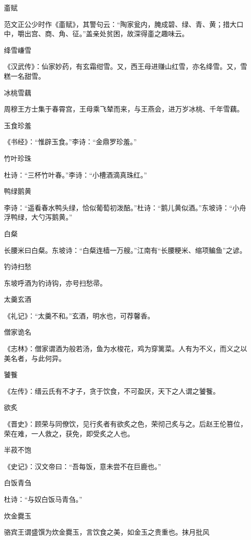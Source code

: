 \documentclass[a4paper,12pt,UTF8,twoside]{ctexbook}
\begin{document}
    齑赋
    
    范文正公少时作《齑赋》，其警句云：“陶家瓮内，腌成碧、绿、青、黄；措大口中，嚼出宫、商、角、征。”盖亲处贫困，故深得齑之趣味云。
    
    绛雪嵰雪
    
    《汉武传》：仙家妙药，有玄霜绀雪。又，西王母进赚山红雪，亦名绛雪。又，雪糕一名甜雪。
    
    冰桃雪藕
    
    周穆王方士集于春霄宫，王母乘飞辇而来，与王燕会，进万岁冰桃、千年雪藕。
    
    玉食珍羞
    
    《书经》：“惟辟玉食。”李诗：“金鼎罗珍羞。”
    
    竹叶珍珠
    
    杜诗：“三杯竹叶春。”李诗：“小槽酒滴真珠红。”
    
    鸭绿鹅黄
    
    李诗：“遥看春水鸭头绿，恰似葡萄初泼醅。”杜诗：“鹅儿黄似酒。”东坡诗：“小舟浮鸭绿，大勺泻鹅黄。”
    
    白粲
    
    长腰米曰白粲。东坡诗：“白粲连樯一万艘。”江南有“长腰粳米、缩项鳊鱼”之谚。
    
    钓诗扫愁
    
    东坡呼酒为钓诗钩，亦号扫愁帚。
    
    太羹玄酒
    
    《礼记》：“太羹不和。”玄酒，明水也，可荐馨香。
    
    僧家诡名
    
    《志林》：僧家谓酒为般若汤，鱼为水梭花，鸡为穿篱菜。人有为不义，而义之以美名者，与此何异。
    
    饕餮
    
    《左传》：缙云氏有不才子，贪于饮食，不可盈厌，天下之人谓之饕餮。
    
    欲炙
    
    《晋史》：顾荣与同僚饮，见行炙者有欲炙之色，荣彻己炙与之。后赵王伦篡位，荣在难，一人救之，获免，即受炙之人也。
    
    半菽不饱
    
    《史记》：汉文帝曰：“吾每饭，意未尝不在巨鹿也。”
    
    白饭青刍
    
    杜诗：“与奴白饭马青刍。”
    
    炊金爨玉
    
    骆宾王谓盛馔为炊金爨玉，言饮食之美，如金玉之贵重也。抹月批风
    
\end{document}
